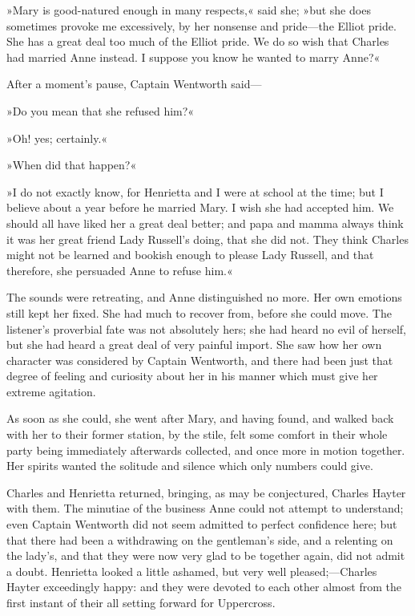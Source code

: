 »Mary is good-natured enough in many respects,« said she; »but she does sometimes provoke me excessively, by her nonsense and pride—the Elliot pride. She has a great deal too much of the Elliot pride. We do so wish that Charles had married Anne instead. I suppose you know he wanted to marry Anne?«

After a moment's pause, Captain Wentworth said—

»Do you mean that she refused him?«

»Oh! yes; certainly.«

»When did that happen?«

»I do not exactly know, for Henrietta and I were at school at the time; but I believe about a year before he married Mary. I wish she had accepted him. We should all have liked her a great deal better; and papa and mamma always think it was her great friend Lady Russell's doing, that she did not. They think Charles might not be learned and bookish enough to please Lady Russell, and that therefore, she persuaded Anne to refuse him.«

The sounds were retreating, and Anne distinguished no more. Her own emotions still kept her fixed. She had much to recover from, before she could move. The listener's proverbial fate was not absolutely hers; she had heard no evil of herself, but she had heard a great deal of very painful import. She saw how her own character was considered by Captain Wentworth, and there had been just that degree of feeling and curiosity about her in his manner which must give her extreme agitation.

As soon as she could, she went after Mary, and having found, and walked back with her to their former station, by the stile, felt some comfort in their whole party being immediately afterwards collected, and once more in motion together. Her spirits wanted the solitude and silence which only numbers could give.

Charles and Henrietta returned, bringing, as may be conjectured, Charles Hayter with them. The minutiae of the business Anne could not attempt to understand; even Captain Wentworth did not seem admitted to perfect confidence here; but that there had been a withdrawing on the gentleman's side, and a relenting on the lady's, and that they were now very glad to be together again, did not admit a doubt. Henrietta looked a little ashamed, but very well pleased;—Charles Hayter exceedingly happy: and they were devoted to each other almost from the first instant of their all setting forward for Uppercross.

